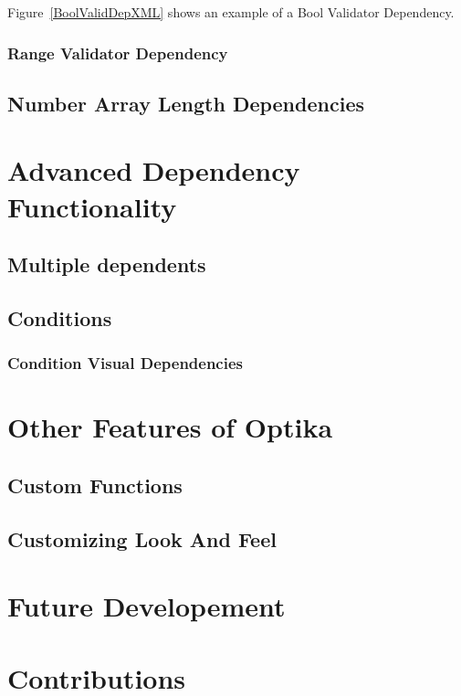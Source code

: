 Figure~\ref{BoolValidDepXML} shows an example of a Bool Validator Dependency. 

\subsubsection{Range Validator Dependency}


\subsection{Number Array Length Dependencies}





\section{Advanced Dependency Functionality}

\subsection{Multiple dependents}

\subsection{Conditions}

\subsubsection{Condition Visual Dependencies}




\section{Other Features of Optika}

\subsection{Custom Functions}

\subsection{Customizing Look And Feel}


\section{Future Developement}

\section{Contributions}
